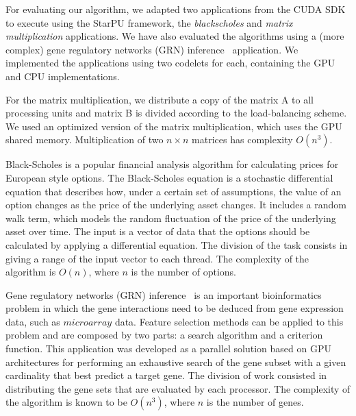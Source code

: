\documentclass[journal]{IEEEtran}
\begin{document}
For evaluating our algorithm, we adapted two applications from the CUDA
SDK~\cite{cuda} to execute using the StarPU framework, the \emph{blackscholes}
and \emph{matrix multiplication} applications. We have also evaluated the
algorithms using a (more complex) gene regulatory networks (GRN)
inference~\cite{borelli2013gene} application. We implemented the applications
using two codelets for each, containing the GPU and CPU implementations.

For the matrix multiplication, we distribute a copy of the matrix A to all
processing units and matrix B is divided according to the load-balancing scheme.
We used an optimized version of the matrix multiplication, which uses the GPU
shared memory. Multiplication of two $n \times n$ matrices has complexity
$O(n^3)$.

Black-Scholes is a popular financial analysis algorithm for calculating prices
for European style options. The Black-Scholes equation is a stochastic
differential equation that describes how, under a certain set of assumptions,
the value of an option changes as the price of the underlying asset changes. It
includes a random walk term, which models the random fluctuation of the price of
the underlying asset over time. The input is a vector of data that the options
should be calculated by applying a differential equation. The division of the
task consists in giving a range of the input vector to each thread. The
complexity of the algorithm is $O(n)$, where $n$ is the number of options.



Gene regulatory networks (GRN) inference~\cite{borelli2013gene} is an important
bioinformatics problem in which the gene interactions need to be deduced from
gene expression data, such as $microarray$ data. Feature selection methods can
be applied to this problem and are composed by two parts: a search algorithm and
a criterion function. This application was developed as a parallel solution
based on GPU architectures for performing an exhaustive search of the gene
subset with a given cardinality that best predict a target gene. The division of
work consisted in distributing the gene sets that are evaluated by each
processor. The complexity of the algorithm is known to be $O(n^3)$, where $n$ is
the number of genes.
\end{document}
